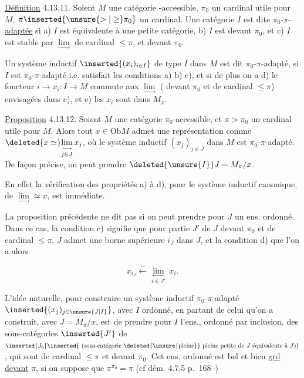 

\uline{Définition} 4.13.11. Soient $M$ une catégorie -accessible, $\pi_0$ un cardinal utile pour $M$, $\pi\inserted{\unsure{>|\geq}\pi_0}$ un cardinal.  Une catégorie $I$ est dite $\pi_0$-$\pi$-\uline{adaptée} si a) $I$ est équivalente à une petite catégorie, b) $I$ est  devant $\pi_0$, et c) $I$ est stable par $\underset{\longrightarrow}{\lim}$ de cardinal $\leq\pi$, et  devant $\pi_0$.


Un système inductif $\inserted{(x_i)_{i\in I}}$ de type $I$ dans $M$ est dit $\pi_0$-$\pi$-adapté, si $I$ est $\pi_0$-$\pi$-adapté i.e. satisfait les conditions a) b) c), et si de plus on a d) le foncteur $i\longrightarrow x_i:I\longrightarrow M$ commute aux $\underset{\longrightarrow}{\lim}$ ( devant $\pi_0$ et de cardinal $\leq\pi$) envisagées dans c), et e) les $x_i$ sont dans $M_\pi$.

\uline{Proposition} 4.13.12. Soient $M$ une catégorie $\pi_0$-accessible, et $\pi>\pi_0$ un cardinal utile pour $M$. Alors tout $x\in\mathrm{Ob}M$ admet une représentation comme $\deleted{x\simeq}\underset{j\in J}{\underset{\longrightarrow}{\lim}}\,x_j$, où le système inductif $(x_j)_{j\in J}$ dans $M$ est $\pi_0$-$\pi$-adapté. De façon précise, on peut prendre $\deleted{\unsure{I}}J=M_\pi/x$.


En effet la vérification des propriétés a) à d), pour le système inductif canonique, de $\underset{\longrightarrow}{\lim}\simeq x$, est immédiate.

La proposition précédente ne dit pas si on peut prendre pour $J$ un ens. ordonné. Dans ce cas, la condition c) signifie que pour  partie $J'$ de $J$  devant $\pi_0$ et de cardinal $\leq\pi$, $J$ admet une borne supérieure $i_J$ dans $J$, et la condition d) que l'on a alors

\[
x_{i_J}\xleftarrow{\sim}\underset{i\in J'}{\underset{\longleftarrow}{\lim}}\,x_i.
\]

L'idée naturelle, pour construire un système inductif $\pi_0$-$\pi$-adapté $\inserted{(x_j)_{j\in\unsure{J|I}}}$, avec $I$ ordonné, en partant de celui qu'on a construit, avec $J=M_\pi/x$, est de prendre pour $I$ l'ens., ordonné par inclusion, des sous-catégories $\inserted{J'}$ de $\inserted{J_0}\inserted{\text{ (sous-catégorie }\deleted{\text{\unsure{pleine}}}\text{ pleine petite de }J\text{ équivalente à }J\text{)}}$, qui sont de cardinal $\leq\pi$ et  devant $\pi_0$.  Cet ens. ordonné est bel et bien  \uline{grd devant} $\pi$, si on suppose que $\pi^{\pi_0}=\pi$ (cf dém. 4.7.5 p.~168--)

